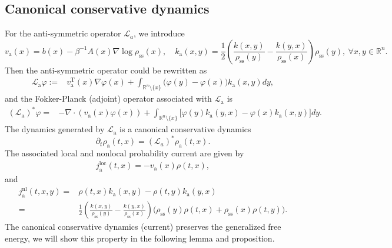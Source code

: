 \documentclass[10pt]{article}
\theoremstyle{definition}
\numberwithin{equation}{section}
\begin{document}
\subsection{Canonical conservative dynamics }

For the anti-symmetric operator $\mathcal{L}_{a}$, we introduce 
\begin{equation*}
    v_\mathrm{a}(x) =  b(x)  - \beta^{-1}A(x)\nabla\log\rho_\mathrm{ss}(x), \quad k_\mathrm{a}(x,y) = \frac{1}{2}\left( \frac{k(x,y)}{\rho_\mathrm{ss}(y)} - \frac{k(y,x)}{\rho_\mathrm{ss}(x)} \right)\rho_\mathrm{ss}(y), \ \forall x,y \in \mathbb{R}^n. 
\end{equation*}
Then the anti-symmetric operator could be rewritten as
\begin{align*}
    \mathcal{L}_\mathrm{a}\varphi
    :=& v_\mathrm{a}^\mathrm{T}(x)\nabla \varphi(x) + \int_{\mathbb{R}^{n}\setminus\{x\}} \Big( \varphi(y)-\varphi(x) \Big)k_\mathrm{a}(x,y)dy,
\end{align*}
and the Fokker-Planck (adjoint) operator associated with $\mathcal{L}_\mathrm{a}$ is
\begin{align*}
    (\mathcal{L}_\mathrm{a})^*\varphi
    =& -\nabla\cdot (v_\mathrm{a}(x)\varphi(x)) + \int_{\mathbb{R}^n \setminus \{ x \} } \Big[ \varphi(y)k_\mathrm{a}(y,x) - \varphi(x)k_\mathrm{a}(x,y) \Big] dy.
\end{align*}
The dynamics generated by $\mathcal{L}_\mathrm{a}$ is a canonical conservative dynamics
\begin{equation*}
    \partial_t \rho_\mathrm{a}(t,x) = (\mathcal{L}_{a})^* \rho_\mathrm{a}(t,x).
\end{equation*}
The associated local and nonlocal probability current are given by
\begin{align*}
    j^\mathrm{loc}_\mathrm{a}(t,x) =  -v_\mathrm{a}(x)\rho(t,x),
\end{align*}
and 
\begin{align*}
    j^\mathrm{nl}_\mathrm{a}(t,x,y)
    =& \rho(t,x)k_\mathrm{a}(x,y) - \rho(t,y)k_\mathrm{a}(y,x)\\
    =& \frac{1}{2}\left( \frac{k(x,y)}{\rho_\mathrm{ss}(y)} - \frac{k(y,x)}{\rho_\mathrm{ss}(x)} \right) \Big( \rho_\mathrm{ss}(y)\rho(t,x) + \rho_\mathrm{ss}(x)\rho(t,y) \Big).
\end{align*}
The canonical conservative dynamics (current) preserves the generalized free energy, we will show this property in the following lemma and proposition.
\end{document}

